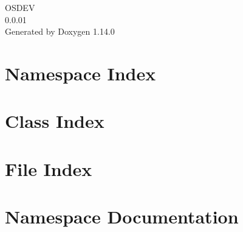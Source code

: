 \documentclass[twoside]{book}
\newcommand{\+}{\discretionary{\mbox{\scriptsize$\hookleftarrow$}}{}{}}
\newcommand{\clearemptydoublepage}{%
    \newpage{\pagestyle{empty}\cleardoublepage}%
  }
\begin{document}
  \raggedbottom
    \hypersetup{pageanchor=false,
                bookmarksnumbered=true,
                pdfencoding=unicode
               }
  \begin{titlepage}
  \vspace*{7cm}
  \begin{center}%
  {\Large OSDEV}\\
  [1ex]\large 0.\+0.\+01 \\
  \vspace*{1cm}
  {\large Generated by Doxygen 1.14.0}\\
  \end{center}
  \end{titlepage}
  \clearemptydoublepage
  \tableofcontents
  \clearemptydoublepage
  \hypersetup{pageanchor=true}
\chapter{Namespace Index}

\chapter{Class Index}

\chapter{File Index}

\chapter{Namespace Documentation}







\end{document}
